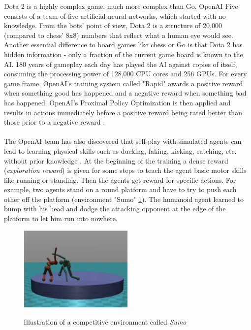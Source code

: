 Dota 2 is a highly complex game, much more complex than Go. OpenAI Five consists of a team of five artificial neural networks, which started with no knowledge. From the bots' point of view, Dota 2 is a structure of 20,000 (compared to chess' 8x8) numbers that reflect what a human eye would see. Another essential difference to board games like chess or Go is that Dota 2 has hidden information - only a fraction of the current game board is known to the AI. 180 years of gameplay each day has played the AI against copies of itself, consuming the processing power of 128,000 CPU cores and 256 GPUs. For every game frame, OpenAI's training system called "Rapid" awards a positive reward when something good has happened and a negative reward when something bad has happened. OpenAI's Proximal Policy Optimization \cite{ppoSchulman2019Mar} is then applied and results in actions immediately before a positive reward being rated better than those prior to a negative reward \cite{dotaOpenAI2019Jun}.\\
\\
The OpenAI team has also discovered that self-play with simulated agents can lead to learning physical skills such as ducking, faking, kicking, catching, etc. without prior knowledge \cite{environmentBansal2017Oct}. At the beginning of the training a dense reward (\textit{exploration reward}) is given for some steps to teach the agent basic motor skills like running or standing. Then the agents get reward for specific actions. For example, two agents stand on a round platform and have to try to push each other off the platform (environment "Sumo" \ref{fig:sumo}). The humanoid agent learned to bump with his head and dodge the attacking opponent at the edge of the platform to let him run into nowhere. \\  
\begin{figure}[H]
  \centering
    \includegraphics[width=0.5\textwidth]{adversarial_learning/images/sumo.JPG}
    \label{fig:sumo}
    \caption{Illustration of a competitive environment called \textit{Sumo} \cite{environmentBansal2017Oct}}
\end{figure}




